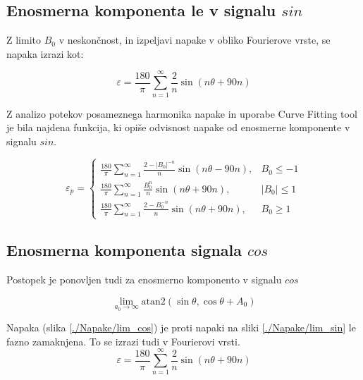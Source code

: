 \subsection{Enosmerna komponenta le v signalu $sin$}

Z limito $B_0$ v neskončnost, in izpeljavi napake v obliko Fourierove vrste, se napaka izrazi kot:


\begin{equation}
\varepsilon = \frac{180}{\pi}\sum_{n=1}^{\infty}\frac{2}{n} \sin (n \theta + 90 n)
\end{equation}


Z analizo potekov posameznega harmonika napake in uporabe Curve Fitting tool je bila najdena funkcija, ki opiše odvisnost napake od enosmerne komponente v signalu $sin$.

\begin{equation}
\label{vrsta_sinoff}
\varepsilon_p=
\begin{cases}
\frac{180}{\pi}\sum_{n=1}^{\infty}\frac{2-|B_0|^{-n}}{n} \sin (n \theta -  90 n), & B_0\leq -1 \\
\frac{180}{\pi}\sum_{n=1}^{\infty}\frac{B_0^n}{n} \sin (n \theta + 90 n), & |B_0|\leq 1 \\
\frac{180}{\pi}\sum_{n=1}^{\infty}\frac{2-B_0^{-n}}{n} \sin (n \theta + 90 n), & B_0\geq 1
\end{cases}
\end{equation}





\subsection{Enosmerna komponenta signala $cos$}

Postopek je ponovljen tudi za enosmerno komponento v signalu $cos$


\begin{equation}
\lim_{a_0 \rightarrow \infty} \mathrm{atan2}(\sin{\theta},\cos{\theta} + A_0)
\end{equation}

Napaka (slika \ref{./Napake/lim_cos}) je proti napaki na  sliki \ref{./Napake/lim_sin} le fazno zamaknjena.
To se izrazi tudi v Fourierovi vrsti.
\begin{equation}
\varepsilon = \frac{180}{\pi}\sum_{n=1}^{\infty}\frac{2}{n} \sin (n \theta+ 90 n)
\end{equation}

